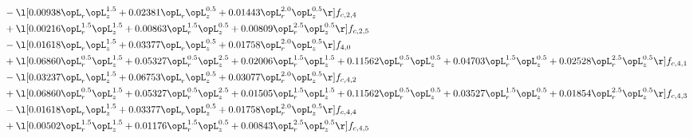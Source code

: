 \begin{alignat}{2}
& - \l[  0.00938 \opL_r \opL_z^{1.5} +  0.02381 \opL_r \opL_z^{0.5} +  0.01443 \opL_r^{2.0} \opL_z^{0.5}  \r] f_{c,2,4} \nonumber \\ 
& + \l[  0.00216 \opL_r^{1.5} \opL_z^{1.5} +  0.00863 \opL_r^{1.5} \opL_z^{0.5} +  0.00809 \opL_r^{2.5} \opL_z^{0.5}  \r] f_{c,2,5} \nonumber \\ 
& - \l[  0.01618 \opL_r \opL_z^{1.5} +  0.03377 \opL_r \opL_z^{0.5} +  0.01758 \opL_r^{2.0} \opL_z^{0.5}  \r] f_{4,0} \nonumber \\ 
& + \l[  0.06860 \opL_r^{0.5} \opL_z^{1.5} +  0.05327 \opL_r^{0.5} \opL_z^{2.5} +  0.02006 \opL_r^{1.5} \opL_z^{1.5} +  0.11562 \opL_r^{0.5} \opL_z^{0.5} +  0.04703 \opL_r^{1.5} \opL_z^{0.5} +  0.02528 \opL_r^{2.5} \opL_z^{0.5}  \r] f_{c,4,1} \nonumber \\ 
& - \l[  0.03237 \opL_r \opL_z^{1.5} +  0.06753 \opL_r \opL_z^{0.5} +  0.03077 \opL_r^{2.0} \opL_z^{0.5}  \r] f_{c,4,2} \nonumber \\ 
& + \l[  0.06860 \opL_r^{0.5} \opL_z^{1.5} +  0.05327 \opL_r^{0.5} \opL_z^{2.5} +  0.01505 \opL_r^{1.5} \opL_z^{1.5} +  0.11562 \opL_r^{0.5} \opL_z^{0.5} +  0.03527 \opL_r^{1.5} \opL_z^{0.5} +  0.01854 \opL_r^{2.5} \opL_z^{0.5}  \r] f_{c,4,3} \nonumber \\ 
& - \l[  0.01618 \opL_r \opL_z^{1.5} +  0.03377 \opL_r \opL_z^{0.5} +  0.01758 \opL_r^{2.0} \opL_z^{0.5}  \r] f_{c,4,4} \nonumber \\ 
& + \l[  0.00502 \opL_r^{1.5} \opL_z^{1.5} +  0.01176 \opL_r^{1.5} \opL_z^{0.5} +  0.00843 \opL_r^{2.5} \opL_z^{0.5}  \r] f_{c,4,5} \nonumber \\ 
\end{alignat} 


